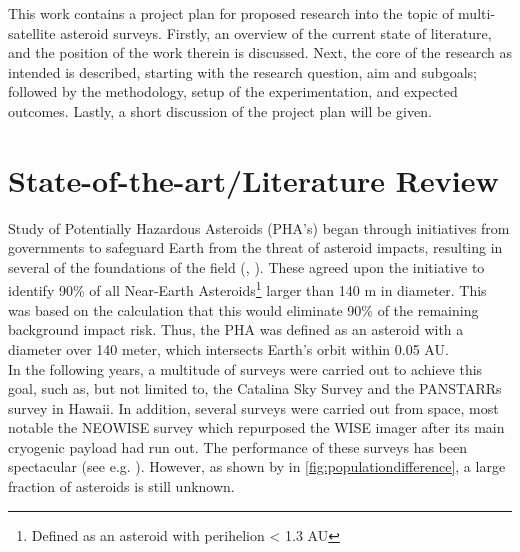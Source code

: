 \documentclass[12pt, english, NoHyper]{AE4010-template}
\begin{document}
This work contains a project plan for proposed research into the topic of multi-satellite asteroid surveys. Firstly, an overview of the current state of literature, and the position of the work therein is discussed. Next, the core of the research as intended is described, starting with the research question, aim and subgoals; followed by the methodology, setup of the experimentation, and expected outcomes. Lastly, a short discussion of the project plan will be given.







\section{State-of-the-art/Literature Review}
Study of Potentially Hazardous Asteroids (PHA's) began through initiatives from governments to safeguard Earth from the threat of asteroid impacts, resulting in several of the foundations of the field (\cite{InitialTaskforce}, \cite{DefendingPlanetEarth}). These agreed upon the initiative to identify 90\% of all Near-Earth Asteroids\footnote{Defined as an asteroid with perihelion < 1.3 AU} larger than 140 m in diameter. This was based on the calculation that this would eliminate 90\% of the remaining background impact risk. Thus, the PHA was defined as an asteroid with a diameter over 140 meter, which intersects Earth's orbit within 0.05 AU. \\

In the following years, a multitude of surveys were carried out to achieve this goal, such as, but not limited to, the Catalina Sky Survey and the PANSTARRs survey in Hawaii. In addition, several surveys were carried out from space, most notable the NEOWISE survey which repurposed the WISE imager after its main cryogenic payload had run out. The performance of these surveys has been spectacular (see e.g. \cite{NEOWISEFlex}). However, as shown by \cite{PopulationHarris} in \autoref{fig:populationdifference}, a large fraction of asteroids is still unknown.\\
\end{document}
